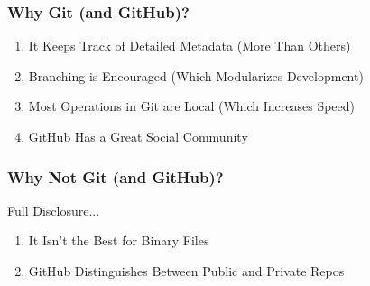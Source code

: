\begin{frame}
\frametitle{\large{Why Git (and GitHub)?}}
\begin{enumerate}
\item It Keeps Track of Detailed Metadata (More Than Others)
\item Branching is Encouraged (Which Modularizes Development)
\item Most Operations in Git are Local (Which Increases Speed)
\item GitHub Has a Great Social Community
\end{enumerate}
\end{frame}
\note{}

\begin{frame}
\frametitle{\large{Why Not Git (and GitHub)?}}
Full Disclosure...
\begin{enumerate}
\item It Isn't the Best for Binary Files
\item GitHub Distinguishes Between Public and Private Repos
\end{enumerate}
\end{frame}
\note{}
